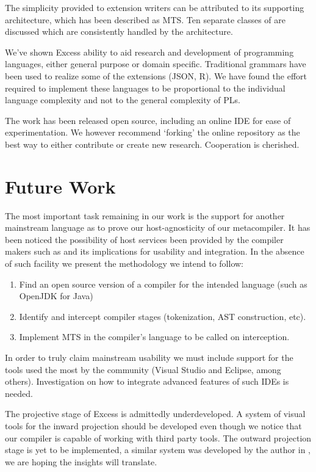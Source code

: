 \documentclass[conference]{IEEEtran}
\begin{document}
The simplicity provided to extension writers can be attributed to its supporting architecture, which has been described as MTS. Ten separate classes of 
are discussed which are consistently handled by the architecture. 

We've shown Excess ability to aid research and development of programming languages, either general purpose or domain specific. Traditional grammars
have been used to realize some of the extensions (JSON, R). We have found the effort required to implement these languages to be proportional to the individual language
complexity and not to the general complexity of PLs. 

The work has been released open source, including an online IDE for ease of experimentation. We however recommend `forking' the online repository as the best way
to either contribute or create new research. Cooperation is cherished. 

\section{Future Work}

The most important task remaining in our work is the support for another mainstream language as to prove our host-agnosticity of our metacompiler. 
It has been noticed the possibility of host services been provided by the compiler makers such as \cite{Roslyn} and its implications for usability and integration. 
In the absence of such facility we present the methodology  we intend to follow:

\begin{enumerate}
   \item Find an open source version of a compiler for the intended language (such as OpenJDK for Java)
   \item Identify and intercept compiler stages (tokenization, AST construction, etc).
   \item Implement MTS in the compiler's language to be called on interception.
 \end{enumerate}

In order to truly claim mainstream usability we must include support for the tools used the most by the community (Visual Studio and Eclipse, among others). Investigation on 
how to integrate advanced features of such IDEs is needed.

The projective stage of Excess is admittedly underdeveloped. A system of visual tools for the inward projection should be developed even though we notice that our compiler
is capable of working with third party tools. The outward projection stage is yet to be implemented, a similar system was developed by the author in \cite{XKP}, we are hoping
the insights will translate.
\end{document}

